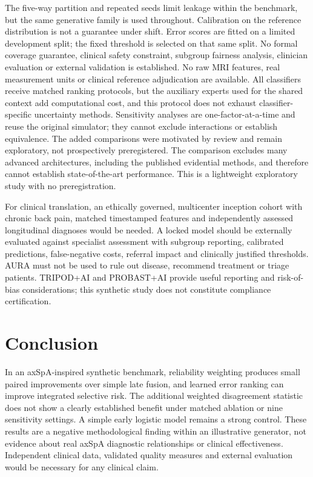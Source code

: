 \documentclass[conference]{IEEEtran}
\begin{document}
The five-way partition and repeated seeds limit leakage within the benchmark, but the same generative family is used throughout. Calibration on the reference distribution is not a guarantee under shift. Error scores are fitted on a limited development split; the fixed threshold is selected on that same split. No formal coverage guarantee, clinical safety constraint, subgroup fairness analysis, clinician evaluation or external validation is established. No raw MRI features, real measurement units or clinical reference adjudication are available. All classifiers receive matched ranking protocols, but the auxiliary experts used for the shared context add computational cost, and this protocol does not exhaust classifier-specific uncertainty methods. Sensitivity analyses are one-factor-at-a-time and reuse the original simulator; they cannot exclude interactions or establish equivalence. The added comparisons were motivated by review and remain exploratory, not prospectively preregistered. The comparison excludes many advanced architectures, including the published evidential methods, and therefore cannot establish state-of-the-art performance. This is a lightweight exploratory study with no preregistration.

For clinical translation, an ethically governed, multicenter inception cohort with chronic back pain, matched timestamped features and independently assessed longitudinal diagnoses would be needed. A locked model should be externally evaluated against specialist assessment with subgroup reporting, calibrated predictions, false-negative costs, referral impact and clinically justified thresholds. AURA must not be used to rule out disease, recommend treatment or triage patients. TRIPOD+AI and PROBAST+AI \cite{tripod,probast} provide useful reporting and risk-of-bias considerations; this synthetic study does not constitute compliance certification.
\section{Conclusion}
In an axSpA-inspired synthetic benchmark, reliability weighting produces small paired improvements over simple late fusion, and learned error ranking can improve integrated selective risk. The additional weighted disagreement statistic does not show a clearly established benefit under matched ablation or nine sensitivity settings. A simple early logistic model remains a strong control. These results are a negative methodological finding within an illustrative generator, not evidence about real axSpA diagnostic relationships or clinical effectiveness. Independent clinical data, validated quality measures and external evaluation would be necessary for any clinical claim.
\end{document}
